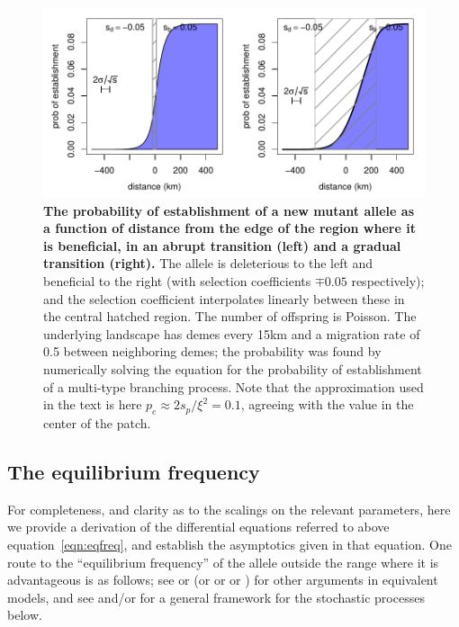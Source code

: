 \documentclass[10pt,letterpaper]{article}
\newcommand{\citet}[1]{\cite{#1}}
\begin{document}
\begin{figure}[ht!]
    \begin{center}
        \includegraphics{prob-establishment}
    \end{center}
    \caption{
        \textbf{The probability of establishment of a new mutant allele as a function of distance from the edge of the region where it is beneficial,
        in an abrupt transition (left) and a gradual transition (right).}
    The allele is deleterious to the left and beneficial to the right (with selection coefficients $\mp 0.05$ respectively);
    and the selection coefficient interpolates linearly between these in the central hatched region.
    The number of offspring is Poisson.
    The underlying landscape has demes every 15km and a migration rate of 0.5 between neighboring demes;
    the probability was found by numerically solving the equation for the probability of establishment of a multi-type branching process.
    Note that the approximation used in the text is here $p_e \approx 2 s_p / \xi^2 = 0.1$,
    agreeing with the value in the center of the patch.
    \label{fig:prob_estab_calcs}
    }
\end{figure}



\subsection[Equilibrium Frequency]{The equilibrium frequency}
\label{apx:eqfreq}

For completeness, and clarity as to the scalings on the relevant parameters,
here we provide a derivation of the differential equations referred to above equation~\eqref{eqn:eqfreq},
and establish the asymptotics given in that equation.
One route to the ``equilibrium frequency'' of the allele outside the range where it is advantageous is as follows;
see \citet{slatkin1973geneflow} or \citet{barton1987establishment}
(or \citet{KPP1937book} or \citet{fisher1937wave} or \citet{haldane1948theory})
for other arguments in equivalent models,
and see \citet{etheridge2000introduction} and/or \citet{dawson1993measurevalued} for a general framework for the stochastic processes below.
\end{document}
